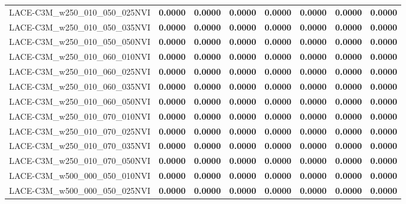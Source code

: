 \begin{table}
\begin{tabular}{lrrrrrrr}
LACE-C3M\_w250\_010\_050\_025NVI & \textbf{0.0000} & \textbf{0.0000} & \textbf{0.0000} & \textbf{0.0000} & \textbf{0.0000} & \textbf{0.0000} & \textbf{0.0000} \\
LACE-C3M\_w250\_010\_050\_035NVI & \textbf{0.0000} & \textbf{0.0000} & \textbf{0.0000} & \textbf{0.0000} & \textbf{0.0000} & \textbf{0.0000} & \textbf{0.0000} \\
LACE-C3M\_w250\_010\_050\_050NVI & \textbf{0.0000} & \textbf{0.0000} & \textbf{0.0000} & \textbf{0.0000} & \textbf{0.0000} & \textbf{0.0000} & \textbf{0.0000} \\
LACE-C3M\_w250\_010\_060\_010NVI & \textbf{0.0000} & \textbf{0.0000} & \textbf{0.0000} & \textbf{0.0000} & \textbf{0.0000} & \textbf{0.0000} & \textbf{0.0000} \\
LACE-C3M\_w250\_010\_060\_025NVI & \textbf{0.0000} & \textbf{0.0000} & \textbf{0.0000} & \textbf{0.0000} & \textbf{0.0000} & \textbf{0.0000} & \textbf{0.0000} \\
LACE-C3M\_w250\_010\_060\_035NVI & \textbf{0.0000} & \textbf{0.0000} & \textbf{0.0000} & \textbf{0.0000} & \textbf{0.0000} & \textbf{0.0000} & \textbf{0.0000} \\
LACE-C3M\_w250\_010\_060\_050NVI & \textbf{0.0000} & \textbf{0.0000} & \textbf{0.0000} & \textbf{0.0000} & \textbf{0.0000} & \textbf{0.0000} & \textbf{0.0000} \\
LACE-C3M\_w250\_010\_070\_010NVI & \textbf{0.0000} & \textbf{0.0000} & \textbf{0.0000} & \textbf{0.0000} & \textbf{0.0000} & \textbf{0.0000} & \textbf{0.0000} \\
LACE-C3M\_w250\_010\_070\_025NVI & \textbf{0.0000} & \textbf{0.0000} & \textbf{0.0000} & \textbf{0.0000} & \textbf{0.0000} & \textbf{0.0000} & \textbf{0.0000} \\
LACE-C3M\_w250\_010\_070\_035NVI & \textbf{0.0000} & \textbf{0.0000} & \textbf{0.0000} & \textbf{0.0000} & \textbf{0.0000} & \textbf{0.0000} & \textbf{0.0000} \\
LACE-C3M\_w250\_010\_070\_050NVI & \textbf{0.0000} & \textbf{0.0000} & \textbf{0.0000} & \textbf{0.0000} & \textbf{0.0000} & \textbf{0.0000} & \textbf{0.0000} \\
LACE-C3M\_w500\_000\_050\_010NVI & \textbf{0.0000} & \textbf{0.0000} & \textbf{0.0000} & \textbf{0.0000} & \textbf{0.0000} & \textbf{0.0000} & \textbf{0.0000} \\
LACE-C3M\_w500\_000\_050\_025NVI & \textbf{0.0000} & \textbf{0.0000} & \textbf{0.0000} & \textbf{0.0000} & \textbf{0.0000} & \textbf{0.0000} & \textbf{0.0000} \\

\end{tabular}
\end{table}
